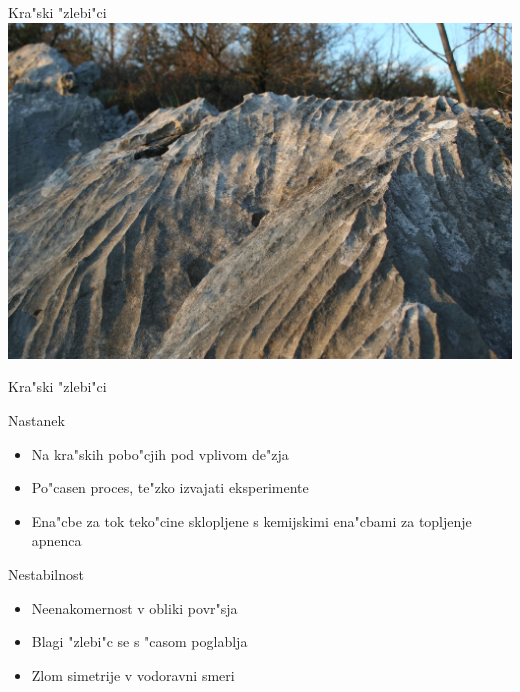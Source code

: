 \documentclass{beamer}
\begin{document}
\begin{frame}{Kra"ski "zlebi"ci}
\includegraphics[width=\textwidth]{./Slike/Zlebici}

\end{frame}

\begin{frame}{Kra"ski "zlebi"ci}
  \begin{block}{Nastanek}
  \begin{itemize}
    \item Na kra"skih pobo"cjih pod vplivom de"zja
    \item Po"casen proces, te"zko izvajati eksperimente
    \item Ena"cbe za tok teko"cine sklopljene s kemijskimi ena"cbami za topljenje apnenca
    \end{itemize}
  \end{block}
  
  \begin{block}{Nestabilnost}
  \begin{itemize}
    \item Neenakomernost v obliki povr"sja
    \item Blagi "zlebi"c se s "casom poglablja
    \item Zlom simetrije v vodoravni smeri
    \end{itemize}
  \end{block}
\end{frame}
\end{document}

